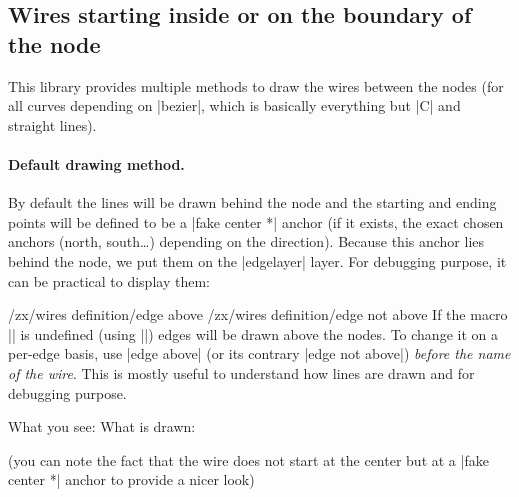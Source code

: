\documentclass[a4paper,doc2]{ltxdoc} %
\begin{document}
\subsection{Wires starting inside or on the boundary of the node}\label{subsec:wiresInsideOutside}

This library provides multiple methods to draw the wires between the nodes (for all curves depending on |bezier|, which is basically everything but |C| and straight lines).

\paragraph{Default drawing method.}
By default the lines will be drawn behind the node and the starting and ending points will be defined to be a |fake center *| anchor (if it exists, the exact chosen anchors (north, south\dots{}) depending on the direction). Because this anchor lies behind the node, we put them on the |edgelayer| layer. For debugging purpose, it can be practical to display them:
\begin{pgfmanualentry}
  \def\extrakeytext{style, }
  \extractcommand\zxEdgesAbove\@@
  \makeatletter%
  \extractkey/zx/wires definition/edge above\@nil%
  \extractkey/zx/wires definition/edge not above\@nil%
  \makeatother
  \pgfmanualbody
  If the macro |\zxEdgesAbove| is undefined (using |\let\zxEdgesAbove\undefined|) edges will be drawn above the nodes. To change it on a per-edge basis, use |edge above| (or its contrary |edge not above|) \emph{before the name of the wire}. This is mostly useful to understand how lines are drawn and for debugging purpose.
\begin{codeexample}[]
  What you see:
  \zx{\zxZ{\alpha+\beta} \ar[dr,s] \\
                         & \zxZ{\alpha+\beta}}
  What is drawn:
\end{codeexample}
(you can note the fact that the wire does not start at the center but at a |fake center *| anchor to provide a nicer look)
\end{pgfmanualentry}
\end{document}
